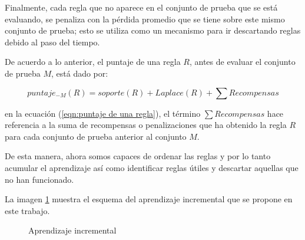\documentclass[12pt]{scrbook}
\theoremstyle{break}
\theoremstyle{break}
\begin{document}
Finalmente, cada regla que no aparece en el conjunto de prueba que se está evaluando, se penaliza con la pérdida promedio que se tiene sobre este mismo conjunto de prueba; esto se utiliza como un mecanismo para ir descartando reglas debido al paso del tiempo.

De acuerdo a lo anterior, el puntaje de una regla $R$, antes de evaluar el conjunto de prueba $M$, está dado por:

\begin{equation} \label{eqn:puntaje de una regla}
puntaje_{-M}(R) = soporte(R) + Laplace(R) + \sum Recompensas
\end{equation}

en la ecuación (\ref{eqn:puntaje de una regla}), el término $ \sum Recompensas$ hace referencia a la suma de recompensas o penalizaciones que ha obtenido la regla $R$ para cada conjunto de prueba anterior al conjunto $M$.

De esta manera, ahora somos capaces de ordenar las reglas y por lo tanto acumular el aprendizaje así como identificar reglas útiles y descartar aquellas que no han funcionado.

La imagen \ref{imagen:aprendizaje_incremental} muestra el esquema del aprendizaje incremental que se propone en este trabajo.


\begin{figure}[ht]
\centering
{}
\caption{\label{imagen:aprendizaje_incremental} Aprendizaje incremental}
\end{figure}
\end{document}
